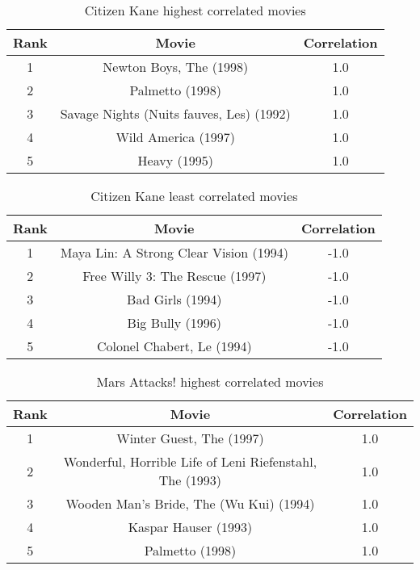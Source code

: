 \documentclass[letterpaper,11pt]{article}
\begin{document}
\begin{table}[htb]
\centering
\begin{tabular}{ | c | c | c |}
\hline
\textbf{Rank} & \textbf{Movie} & \textbf{Correlation} \\
\hline
1 & Newton Boys, The (1998) & 1.0 \\
\hline
2 & Palmetto (1998) & 1.0 \\
\hline
3 & Savage Nights (Nuits fauves, Les) (1992) & 1.0 \\ 
\hline
4 & Wild America (1997) & 1.0 \\
\hline
5 & Heavy (1995) & 1.0 \\
\hline
\end{tabular}
\caption{Citizen Kane highest correlated movies}
\label{table:q4most}
\end{table}

\begin{table}[htb]
\centering
\begin{tabular}{ | c | c | c |}
\hline
\textbf{Rank} & \textbf{Movie} & \textbf{Correlation} \\
\hline
1 & Maya Lin: A Strong Clear Vision (1994) & -1.0 \\
\hline
2 & Free Willy 3: The Rescue (1997) & -1.0 \\
\hline
3 & Bad Girls (1994) & -1.0 \\ 
\hline
4 & Big Bully (1996) & -1.0 \\
\hline
5 & Colonel Chabert, Le (1994) & -1.0 \\
\hline
\end{tabular}
\caption{Citizen Kane least correlated movies}
\label{table:q4least}
\end{table}


\begin{table}[htb]
\centering
\begin{tabular}{ | c | c | c |}
\hline
\textbf{Rank} & \textbf{Movie} & \textbf{Correlation} \\
\hline
1 & Winter Guest, The (1997) & 1.0 \\
\hline
2 & Wonderful, Horrible Life of Leni Riefenstahl, The (1993) & 1.0 \\
\hline
3 & Wooden Man's Bride, The (Wu Kui) (1994) & 1.0 \\ 
\hline
4 & Kaspar Hauser (1993) & 1.0 \\
\hline
5 & Palmetto (1998) & 1.0 \\
\hline
\end{tabular}
\caption{Mars Attacks! highest correlated movies}
\label{table:q4most2}
\end{table}
\end{document}
